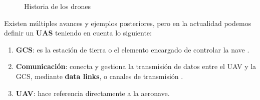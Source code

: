 \begin{figure} [h]
	\centering
	\quad
	\quad
	\caption{Historia de los drones}
	\label{fig:drone_history}
\end{figure}

Existen múltiples avances y ejemplos posteriores, pero en la actualidad podemos definir un \textbf{\ac{UAS}} teniendo en cuenta lo siguiente:

\begin{enumerate}
	\item \textbf{\ac{GCS}}: es la estación de tierra o el elemento encargado de controlar la nave \cite{gcs-definicion}.

	\item \textbf{Comunicación}: conecta y gestiona la transmisión de datos entre el \ac{UAV} y la \ac{GCS}, mediante \textbf{data links}, o canales de transmisión \cite{data-link-definicion}.
	
    \item \textbf{\ac{UAV}}: hace referencia directamente a la aeronave.
\end{enumerate} \cite{uas-definicion}

